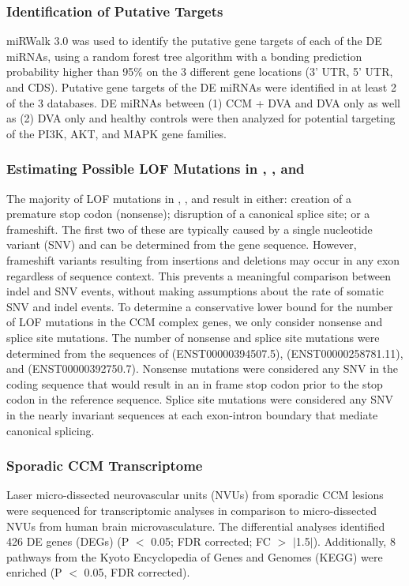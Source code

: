 \subsubsection{Identification of Putative Targets}
miRWalk 3.0 was used to identify the putative gene targets of each of the DE miRNAs, using a random forest tree algorithm with a bonding prediction probability higher than 95\% on the 3 different gene locations (3' UTR, 5' UTR, and CDS)\citep{sticht2018}. Putative gene targets of the DE miRNAs were identified in at least 2 of the 3 databases. DE miRNAs between (1) CCM + DVA and DVA only as well as (2) DVA only and healthy controls were then analyzed for potential targeting of the PI3K, AKT, and MAPK gene families. 

\subsubsection{Estimating Possible LOF Mutations in , , and }
The majority of LOF mutations in , , and  result in either: creation of a premature stop codon (nonsense); disruption of a canonical splice site; or a frameshift. The first two of these are typically caused by a single nucleotide variant (SNV) and can be determined from the gene sequence. However, frameshift variants resulting from insertions and deletions may occur in any exon regardless of sequence context. This prevents a meaningful comparison between indel and SNV events, without making assumptions about the rate of somatic SNV and indel events. To determine a conservative lower bound for the number of LOF mutations in the CCM complex genes, we only consider nonsense and splice site mutations. The number of nonsense and splice site mutations were determined from the sequences of  (ENST00000394507.5),  (ENST00000258781.11), and  (ENST00000392750.7). Nonsense mutations were considered any SNV in the coding sequence that would result in an in frame stop codon prior to the stop codon in the reference sequence. Splice site mutations were considered any SNV in the nearly invariant sequences at each exon-intron boundary that mediate canonical splicing. 
	
\subsubsection{Sporadic CCM Transcriptome}
Laser micro-dissected neurovascular units (NVUs) from sporadic CCM lesions were sequenced for transcriptomic analyses in comparison to micro-dissected NVUs from human brain microvasculature. The differential analyses identified 426 DE genes (DEGs) (P $<$ 0.05; FDR corrected; FC $>$ $\vert$1.5$\vert$). Additionally, 8 pathways from the Kyoto Encyclopedia of Genes and Genomes (KEGG) were enriched (P $<$ 0.05, FDR corrected).  


